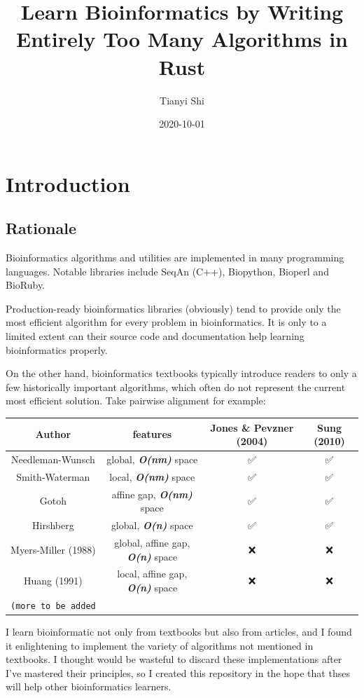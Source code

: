 \documentclass[
]{book}
\title{Learn Bioinformatics by Writing Entirely Too Many Algorithms in Rust}
\author{Tianyi Shi}
\date{2020-10-01}
\begin{document}
\maketitle

{
\setcounter{tocdepth}{1}
\tableofcontents
}
\hypertarget{intro}{%
\chapter{Introduction}\label{intro}}

\hypertarget{rationale}{%
\section{Rationale}\label{rationale}}

Bioinformatics algorithms and utilities are implemented in many programming languages. Notable libraries include SeqAn (C++), Biopython, Bioperl and BioRuby.

Production-ready bioinformatics libraries (obviously) tend to provide only the most efficient algorithm for every problem in bioinformatics. It is only to a limited extent can their source code and documentation help learning bioinformatics properly.

On the other hand, bioinformatics textbooks typically introduce readers to only a few historically important algorithms, which often do not represent the current most efficient solution. Take pairwise alignment for example:

\begin{longtable}[]{@{}cccc@{}}
\toprule
Author & features & Jones \& Pevzner (2004) & Sung (2010)\tabularnewline
\midrule
\endhead
Needleman-Wunsch & global, \textbf{\emph{O(nm)}} space & ✅ & ✅\tabularnewline
Smith-Waterman & local, \textbf{\emph{O(nm)}} space & ✅ & ✅\tabularnewline
Gotoh & affine gap, \textbf{\emph{O(nm)}} space & ✅ & ✅\tabularnewline
Hirshberg & global, \textbf{\emph{O(n)}} space & ✅ & ✅\tabularnewline
Myers-Miller (1988) & global, affine gap, \textbf{\emph{O(n)}} space & ❌ & ❌\tabularnewline
Huang (1991) & local, affine gap, \textbf{\emph{O(n)}} space & ❌ & ❌\tabularnewline
\texttt{(more\ to\ be\ added} & & &\tabularnewline
\bottomrule
\end{longtable}

I learn bioinformatic not only from textbooks but also from articles, and I found it enlightening to implement the variety of algorithms not mentioned in textbooks. I thought would be wasteful to discard these implementations after I've mastered their principles, so I created this repository in the hope that thses will help other bioinformatics learners.
\end{document}
